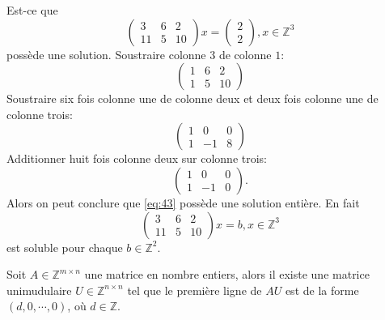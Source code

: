 \begin{example}
  \label{exe:28}
  Est-ce que
  \begin{equation}
    \label{eq:43}
     \begin{pmatrix}
      3 & 6 & 2 \\
      11 & 5 & 10
    \end{pmatrix} x =
    \begin{pmatrix}
      2 \\ 2
    \end{pmatrix}, x ∈ℤ^3
      \end{equation}
  possède une solution.
  Soustraire  colonne $3$ de colonne $1$:
  \begin{displaymath}
     \begin{pmatrix}
      1 & 6 & 2 \\
      1 & 5 & 10
    \end{pmatrix}
  \end{displaymath}
  Soustraire six fois colonne une de colonne deux et deux fois colonne une de colonne trois:
 \begin{displaymath}
     \begin{pmatrix}
      1 & 0 & 0 \\
      1 & -1 & 8
    \end{pmatrix}
  \end{displaymath}
  Additionner huit fois colonne deux sur colonne trois:
  \begin{displaymath}
  \begin{pmatrix}
      1 & 0 & 0 \\
      1 & -1 & 0
    \end{pmatrix}. 
  \end{displaymath}      
    Alors on peut conclure que \eqref{eq:43} possède une solution entière. En fait
    \begin{displaymath}
    \label{eq:43}
     \begin{pmatrix}
      3 & 6 & 2 \\
      11 & 5 & 10
    \end{pmatrix} x =
    b, x ∈ℤ^3
  \end{displaymath} est soluble pour chaque $b ∈ℤ^2$. 
\end{example}


\begin{lemma}
  \label{lem:24}
  Soit  $A ∈ℤ^{ m ×n}$ une matrice en nombre entiers, alors il  existe une matrice unimudulaire $U ∈ℤ^{ n ×n}$ tel que le première ligne de $AU$ est de la forme $(d,0,\cdots,0)$, où $d ∈ℤ$.
\end{lemma}

